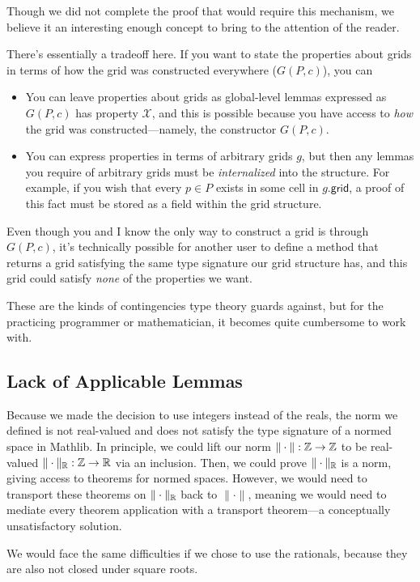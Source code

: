 \documentclass{article}
\begin{document}
Though we did not complete the proof that would require this mechanism, we believe it an interesting enough concept to bring to the attention of the reader.

There's essentially a tradeoff here.
If you want to state the properties about grids in terms of how the grid was constructed everywhere ($G(P, c)$), you can
\begin{itemize}
  \item You can leave properties about grids as global-level lemmas expressed as $G(P, c)$ has property $\mathcal{X}$, and this is possible because you have access to \textit{how} the grid was constructed---namely, the constructor $G(P, c)$.
  \item You can express properties in terms of arbitrary grids $g$, but then any lemmas you require of arbitrary grids must be \textit{internalized} into the structure.
  For example, if you wish that every $p \in P$ exists in some cell in $g.\mathsf{grid}$, a proof of this fact must be stored as a field within the grid structure.
\end{itemize}
Even though you and I know the only way to construct a grid is through $G(P, c)$, it's technically possible for another user to define a method that returns a grid satisfying the same type signature our grid structure has, and this grid could satisfy \textit{none} of the properties we want.

These are the kinds of contingencies type theory guards against, but for the practicing programmer or mathematician, it becomes quite cumbersome to work with.


\subsection{Lack of Applicable Lemmas}
Because we made the decision to use integers instead of the reals, the norm we defined is not real-valued and does not satisfy the type signature of a normed space in Mathlib.  
In principle, we could lift our norm $\| \cdot \| : \mathbb{Z} \to \mathbb{Z}$ to be real-valued $\| \cdot \|_{\mathbb{R}} : \mathbb{Z} \to \mathbb{R}$ via an inclusion.
Then, we could prove $\| \cdot \|_{\mathbb{R}}$ is a norm, giving access to theorems for normed spaces.
However, we would need to transport these theorems on $\| \cdot \|_{\mathbb{R}}$ back to $\| \cdot \|$, meaning we would need to mediate every theorem application with a transport theorem---a conceptually unsatisfactory solution.

We would face the same difficulties if we chose to use the rationals, because they are also not closed under square roots.
\end{document}
